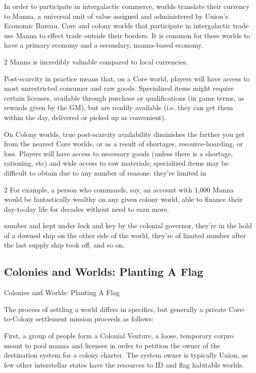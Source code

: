 In order to participate in intergalactic commerce, worlds translate their currency to Manna, a
universal unit of value assigned and administered by Union’s Economic Bureau. Core and colony
worlds that participate in intergalactic trade use Manna to effect trade outside their borders. It is
common for these worlds to have a primary economy and a secondary, manna-based economy.

                                                                       2
Manna is incredibly valuable compared to local currencies.


Post-scarcity in practice means that, on a Core world, players will have access to most
unrestricted consumer and raw goods. Specialized items might require certain licenses, available
through purchase or qualifications (in game terms, as rewards given by the GM), but are readily
available (i.e. they can get them within the day, delivered or picked up as convenient).


On Colony worlds, true post-scarcity availability diminishes the farther you get from the nearest
Core worlds, or as a result of shortages, resource-hoarding, or loss. Players will have access to
necessary goods (unless there is a shortage, rationing, etc) and wide access to raw materials;
specialized items may be difficult to obtain due to any number of reasons: they’re limited in

2 For example, a person who commands, say, an account with 1,000 Manna would be fantastically wealthy
on any given colony world, able to finance their day-to-day life for decades without need to earn more.




number and kept under lock and key by the colonial governor, they’re in the hold of a downed
ship on the other side of the world, they’re of limited number after the last supply ship took off,
and so on.

\subsection{Colonies and Worlds: Planting A Flag}
Colonies and Worlds: Planting A Flag

The process of settling a world differs in specifics, but generally a private Core-to-Colony
settlement mission proceeds as follows:


First, a group of people form a Colonial Venture, a loose, temporary corpro meant to pool manna
and licenses in order to petition the owner of the destination system for a colony charter. The
system owner is typically Union, as few other interstellar states have the resources to ID and flag
habitable worlds.


